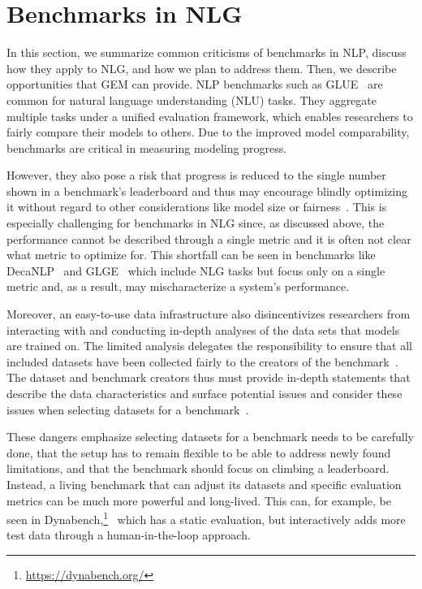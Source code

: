 \documentclass[11pt,a4paper]{article}
\newcommand{\GEM}{\textsc{GEM}}
\begin{document}
\section{Benchmarks in NLG}

In this section, we summarize common criticisms of benchmarks in NLP, discuss how they apply to NLG, and how we plan to address them. Then, we describe opportunities that \GEM{} can provide. NLP benchmarks such as GLUE~\citep{wang2018glue} are common for natural language understanding (NLU) tasks. They aggregate multiple tasks under a unified evaluation framework, which enables researchers to fairly compare their models to others. Due to the improved model comparability, benchmarks are critical in measuring modeling progress. 

However, they also pose a risk that progress is reduced to the single number shown in a benchmark's leaderboard and thus may encourage blindly optimizing it without regard to other considerations like model size or fairness~\citep{ethayarajh2020utility}.
This is especially challenging for benchmarks in NLG since, as discussed above, the performance cannot be described through a single metric and it is often not clear what metric to optimize for. This shortfall can be seen in benchmarks like DecaNLP~\citep{mccann2018natural} and GLGE~\citep{liu2020glge} which include NLG tasks but focus only on a single metric and, as a result, may mischaracterize a system's performance.

Moreover, an easy-to-use data infrastructure also disincentivizes researchers from interacting with and conducting in-depth analyses of the data sets that models are trained on. 
The limited analysis delegates the responsibility to ensure that all included datasets have been collected fairly to the creators of the benchmark~\citep{denton2020bringing}. 
The dataset and benchmark creators thus must provide in-depth statements that describe the data characteristics and surface potential issues and consider these issues when selecting datasets for a benchmark~\citep{gebru2018datasheets,bender2018data}.  

These dangers emphasize selecting datasets for a benchmark needs to be carefully done, that the setup has to remain flexible to be able to address newly found limitations, and that the benchmark should focus on climbing a leaderboard. Instead, a living benchmark that can adjust its datasets and specific evaluation metrics can be much more powerful and long-lived. This can, for example, be seen in Dynabench,\footnote{\url{https://dynabench.org/}}~\citep{potts2020dynasent} which has a static evaluation, but interactively adds more test data through a human-in-the-loop approach. 
\end{document}
